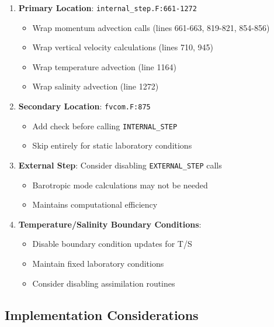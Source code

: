\documentclass[12pt,a4paper]{article}
\begin{document}
\begin{enumerate}
    \item \textbf{Primary Location}: \texttt{internal\_step.F:661-1272}
        \begin{itemize}
            \item Wrap momentum advection calls (lines 661-663, 819-821, 854-856)
            \item Wrap vertical velocity calculations (lines 710, 945)
            \item Wrap temperature advection (line 1164)
            \item Wrap salinity advection (line 1272)
        \end{itemize}

    \item \textbf{Secondary Location}: \texttt{fvcom.F:875}
        \begin{itemize}
            \item Add check before calling \texttt{INTERNAL\_STEP}
            \item Skip entirely for static laboratory conditions
        \end{itemize}

    \item \textbf{External Step}: Consider disabling \texttt{EXTERNAL\_STEP} calls
        \begin{itemize}
            \item Barotropic mode calculations may not be needed
            \item Maintains computational efficiency
        \end{itemize}

    \item \textbf{Temperature/Salinity Boundary Conditions}:
        \begin{itemize}
            \item Disable boundary condition updates for T/S
            \item Maintain fixed laboratory conditions
            \item Consider disabling assimilation routines
        \end{itemize}
\end{enumerate}

\subsection{Implementation Considerations}
\end{document}
